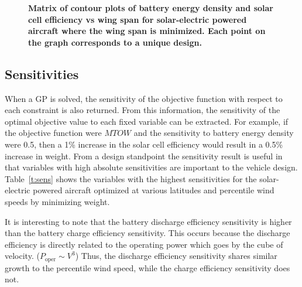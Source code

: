\documentclass[]{aiaa-tc}%
\begin{document}
 \begin{figure}[H]
 \begin{subfigmatrix}{3}%
 \end{subfigmatrix}
 \caption{\textbf{Matrix of contour plots of battery energy density and solar cell efficiency vs wing span for solar-electric powered aircraft where the wing span is minimized. Each point on the graph corresponds to a unique design.}}
 \label{f:solarcontours}
\end{figure}

\subsection{Sensitivities}

When a GP is solved, the sensitivity of the objective function with respect to each constraint is also returned.  
From this information, the sensitivity of the optimal objective value to each fixed variable can be extracted.\cite{hoburgthesis} 
For example, if the objective function were $MTOW$ and the sensitivity to battery energy density were 0.5, then a 1\% increase in the solar cell efficiency would result in a 0.5\% increase in weight.  
From a design standpoint the sensitivity result is useful in that variables with high absolute sensitivities are important to the vehicle design. 
Table~\ref{t:sens} shows the variables with the highest sensitivities for the solar-electric powered aircraft optimized at various latitudes and percentile wind speeds by minimizing weight. 

It is interesting to note that the battery discharge efficiency sensitivity is higher than the battery charge efficiency sensitivity.
This occurs because the discharge efficiency is directly related to the operating power which goes by the cube of velocity. ($P_{\text{oper}}\sim V^3$)
Thus, the discharge efficiency sensitivity shares similar growth to the percentile wind speed, while the charge efficiency sensitivity does not. 
\end{document}
